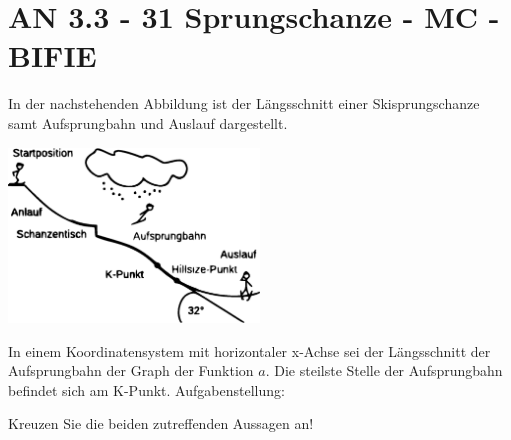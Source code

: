 \section{AN 3.3 - 31 Sprungschanze - MC - BIFIE}

\begin{beispiel}[AN 3.3]{1} %
In der nachstehenden Abbildung ist der Längsschnitt einer Skisprungschanze samt Aufsprungbahn und Auslauf dargestellt. 

\begin{center}
\includegraphics[width=0.5\textwidth]{../_database/Bilder/GrafikAN3331.eps}
\end{center}


In einem Koordinatensystem mit horizontaler x-Achse sei der Längsschnitt der Aufsprungbahn der Graph der Funktion $a$. Die steilste Stelle der Aufsprungbahn befindet sich am K-Punkt.
Aufgabenstellung:\leer

Kreuzen Sie die beiden zutreffenden Aussagen an! 

				
\end{beispiel}